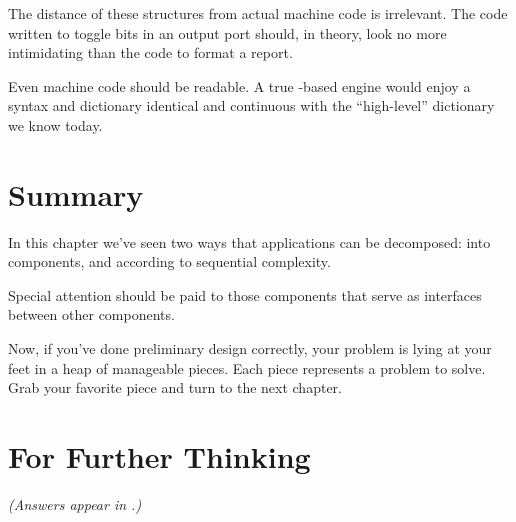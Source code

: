 The distance of these structures from actual machine code is
irrelevant. The code written to toggle bits in an output port should,
in theory, look no more intimidating than the code to format a report.

Even machine code should be readable. A true \Forth{}-based
engine would enjoy a syntax and dictionary identical and continuous
with the ``high-level'' dictionary we know today.%

\section{Summary}

In this chapter we've seen two ways that applications can be
decomposed: into components, and according to sequential complexity.

Special attention should be paid to those components that serve as
interfaces between other components.

Now, if you've done preliminary design correctly, your problem is
lying at your feet in a heap of manageable pieces. Each piece represents a
problem to solve. Grab your favorite piece and turn to the next chapter.%

\section{For Further Thinking}

\emph{(Answers appear in .)}

